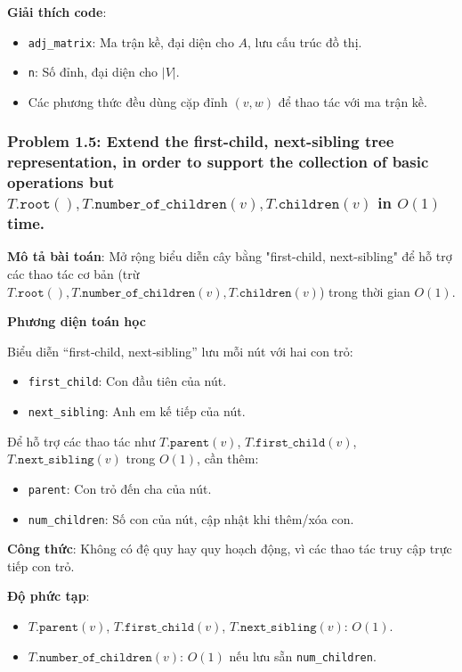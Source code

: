 \documentclass[a4paper,12pt]{article}
\begin{document}
\bigskip
\textbf{Giải thích code}:
\begin{itemize}
    \item \texttt{adj\_matrix}: Ma trận kề, đại diện cho \(A\), lưu cấu trúc đồ thị.
    \item \texttt{n}: Số đỉnh, đại diện cho \(\lvert V\rvert\).
    \item Các phương thức đều dùng cặp đỉnh \((v,w)\) để thao tác với ma trận kề.
\end{itemize}

\subsubsection{Problem 1.5: Extend the first-child, next-sibling tree representation, in order to support the collection of basic operations but $T.\texttt{root}(), T.\texttt{number\_of\_children}(v), T.\texttt{children}(v)$ in $O(1)$ time.}
\textbf{Mô tả bài toán}: Mở rộng biểu diễn cây bằng "first-child, next-sibling" để hỗ trợ các thao tác cơ bản (trừ \( T.\texttt{root}(), T.\texttt{number\_of\_children}(v), T.\texttt{children}(v) \)) trong thời gian \( O(1) \).

\textbf{Phương diện toán học}

Biểu diễn “first‑child, next‑sibling” lưu mỗi nút với hai con trỏ:
\begin{itemize}
    \item \texttt{first\_child}: Con đầu tiên của nút.
    \item \texttt{next\_sibling}: Anh em kế tiếp của nút.
\end{itemize}

Để hỗ trợ các thao tác như \(T.\texttt{parent}(v)\), \(T.\texttt{first\_child}(v)\), \(T.\texttt{next\_sibling}(v)\) trong \(O(1)\), cần thêm:
\begin{itemize}
    \item \texttt{parent}: Con trỏ đến cha của nút.
    \item \texttt{num\_children}: Số con của nút, cập nhật khi thêm/xóa con.
\end{itemize}

\textbf{Công thức}: Không có đệ quy hay quy hoạch động, vì các thao tác truy cập trực tiếp con trỏ.

\textbf{Độ phức tạp}:
\begin{itemize}
    \item \(T.\texttt{parent}(v)\), \(T.\texttt{first\_child}(v)\), \(T.\texttt{next\_sibling}(v)\): \(O(1)\).
    \item \(T.\texttt{number\_of\_children}(v)\): \(O(1)\) nếu lưu sẵn \texttt{num\_children}.
\end{itemize}
\end{document}
